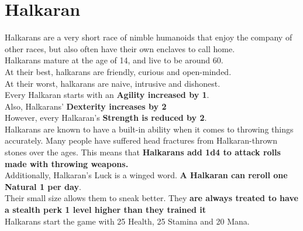 \section{Halkaran}
Halkarans are a very short race of nimble humanoids that enjoy the company of other races, but also often have their own enclaves to call home.\\
Halkarans mature at the age of 14, and live to be around 60.\\
At their best, halkarans are friendly, curious and open-minded.\\
At their worst, halkarans are naive, intrusive and dishonest.\\
Every Halkaran starts with an \textbf{Agility increased by 1}.\\
Also, Halkarans' \textbf{Dexterity increases by 2}\\
However, every Halkaran's \textbf{Strength is reduced by 2}.\\
Halkarans are known to have a built-in ability when it comes to throwing things accurately. Many people have suffered head fractures from Halkaran-thrown stones over the ages. This means that \textbf{Halkarans add 1d4 to attack rolls made with throwing weapons.}\\
Additionally, Halkaran's Luck is a winged word. \textbf{A Halkaran can reroll one Natural 1 per day}.\\
Their small size allows them to sneak better. They \textbf{are always treated to have a stealth perk 1 level higher than they trained it}\\
Halkarans start the game with 25 Health, 25 Stamina and 20 Mana.\\